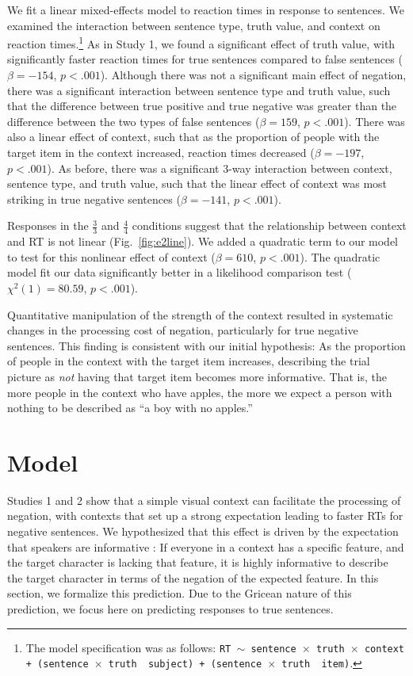 \documentclass[10pt,letterpaper]{article}
\begin{document}
We fit a linear mixed-effects model to reaction times in response to sentences.  We examined the interaction between sentence type, truth value, and context on reaction times.\footnote{The model specification was as follows: \texttt{RT $\sim$ sentence~$\times$~truth~$\times$~context + (sentence~$\times$~truth~\textbar~subject) +  (sentence~$\times$~truth~\textbar~item)}.}  As in Study 1, we found a significant effect of truth value, with significantly faster reaction times for true sentences compared to false sentences ($\beta= -154$, $p< .001$).  Although there was not a significant main effect of negation, there was a significant interaction between sentence type and truth value, such that the difference between true positive and true negative was greater than the difference between the two types of false sentences ($\beta= 159$, $p< .001$).  There was also a linear effect of context, such that as the proportion of people with the target item in the context increased, reaction times decreased ($\beta= -197$, $p< .001$).  As before, there was a significant 3-way interaction between context, sentence type, and truth value, such that the linear effect of context was most striking in true negative sentences ($\beta= -141$, $p< .001$).

Responses in the $\frac{3}{3}$ and $\frac{4}{4}$ conditions suggest that the relationship between context and RT is not linear (Fig.\ \ref{fig:e2line}).  We added a quadratic term to our model to test for this nonlinear effect of context ($\beta= 610 $, $p< .001$).  The quadratic model fit our data significantly better in a likelihood comparison test ($\chi^{2}(1) =80.59$, $p<.001$).  

Quantitative manipulation of the strength of the context resulted in systematic changes in the processing cost of negation, particularly for true negative sentences.  This finding is consistent with our initial hypothesis: As the proportion of people in the context with the target item increases, describing the trial picture as \emph{not} having that target item becomes more informative.  That is, the more people in the context who have apples, the more we expect a person with nothing to be described as ``a boy with no apples.'' 


\section{Model}

Studies 1 and 2 show that a simple visual context can facilitate the processing of negation, with contexts that set up a strong expectation leading to faster RTs for negative sentences.  We hypothesized that this effect is driven by the expectation that speakers are informative \cite{grice1975,frank2012}: If everyone in a context has a specific feature, and the target character is lacking that feature, it is highly informative to describe the target character in terms of the negation of the expected feature. In this section, we formalize this prediction. Due to the Gricean nature of this prediction, we focus here on predicting responses to true sentences.   
\end{document}
